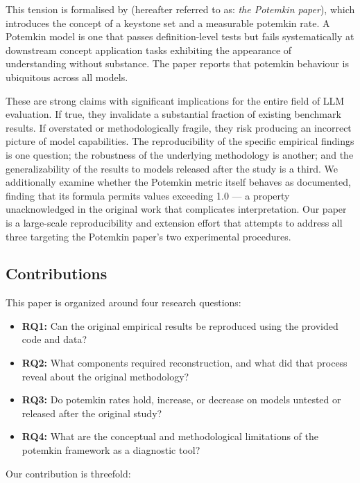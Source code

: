 \documentclass[sigconf,authordraft]{acmart}
\begin{document}
This tension is formalised by \cite{mancoridis2025potemkin} 
(hereafter referred to as: \textit{the Potemkin paper}), which introduces the concept of a keystone set and a measurable potemkin rate. A Potemkin model is one that passes definition-level tests but fails systematically at downstream concept application tasks exhibiting the appearance of understanding without substance. The paper reports that potemkin behaviour is ubiquitous across all models.

These are strong claims with significant implications for the entire field of LLM evaluation. If true, they invalidate a substantial fraction of existing benchmark results. If overstated or methodologically fragile, they risk producing an incorrect picture of model capabilities. The reproducibility of the specific empirical findings is one question; the robustness of the underlying methodology is another; and the generalizability of the results to models released after the study is a third.
We additionally examine whether the Potemkin metric itself behaves as documented, finding that its formula permits values exceeding 1.0 --- a property unacknowledged in the original work that complicates interpretation. Our paper is a large-scale reproducibility and extension effort that attempts to address all three targeting the Potemkin paper's two experimental procedures.


\subsection{Contributions}
This paper is organized around four research questions:

\begin{itemize}
    \item \textbf{RQ1:} Can the original empirical results be reproduced using the provided code and data?
    \item \textbf{RQ2:} What components required reconstruction, and what did that process reveal about the original methodology?
    \item \textbf{RQ3:} Do potemkin rates hold, increase, or decrease on models untested or released after the original study?
    \item \textbf{RQ4:} What are the conceptual and methodological limitations of the potemkin framework as a diagnostic tool?
\end{itemize}

Our contribution is threefold:
\end{document}
